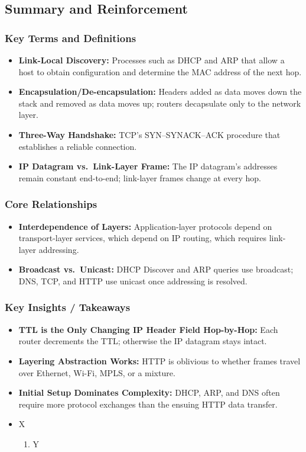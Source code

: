 \documentclass[12pt]{article}
\begin{document}
\subsection{Summary and Reinforcement}

\subsubsection{Key Terms and Definitions}

\begin{itemize}
    \item \textbf{Link-Local Discovery:} Processes such as DHCP and ARP that allow a host to obtain configuration and determine the MAC address of the next hop.
    \item \textbf{Encapsulation/De-encapsulation:} Headers added as data moves down the stack and removed as data moves up; routers decapsulate only to the network layer.
    \item \textbf{Three-Way Handshake:} TCP's SYN--SYNACK--ACK procedure that establishes a reliable connection.
    \item \textbf{IP Datagram vs.\ Link-Layer Frame:} The IP datagram's addresses remain constant end-to-end; link-layer frames change at every hop.
\end{itemize}

\subsubsection{Core Relationships}

\begin{itemize}
    \item \textbf{Interdependence of Layers:} Application-layer protocols depend on transport-layer services, which depend on IP routing, which requires link-layer addressing.
    \item \textbf{Broadcast vs.\ Unicast:} DHCP Discover and ARP queries use broadcast; DNS, TCP, and HTTP use unicast once addressing is resolved.
\end{itemize}

\subsubsection{Key Insights / Takeaways}

\begin{itemize}
    \item \textbf{TTL is the Only Changing IP Header Field Hop-by-Hop:} Each router decrements the TTL; otherwise the IP datagram stays intact.
    \item \textbf{Layering Abstraction Works:} HTTP is oblivious to whether frames travel over Ethernet, Wi-Fi, MPLS, or a mixture.
    \item \textbf{Initial Setup Dominates Complexity:} DHCP, ARP, and DNS often require more protocol exchanges than the ensuing HTTP data transfer.
\end{itemize}



\begin{itemize}
    \item X
          \begin{enumerate}
              \item Y
          \end{enumerate}
\end{itemize}
\end{document}
